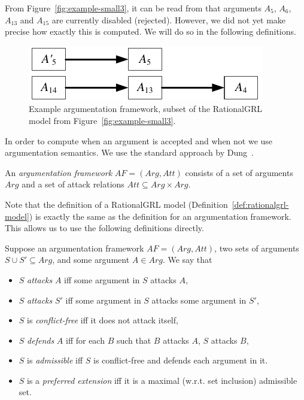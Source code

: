 
From Figure~\ref{fig:example-small3}, it can be read from that arguments $A_5$, $A_6$, $A_{13}$ and $A_{15}$ are currently disabled (rejected). However, we did not yet make precise how exactly this is computed. We will do so in the following definitions.
\begin{figure}[b]
\centering
\includegraphics[]{img/Example1-new-arguments.pdf}
\caption{Example argumentation framework, subset of the RationalGRL model from Figure~\ref{fig:example-small3}.}
\label{fig:goalmodeling:arg2}
\end{figure}
In order to compute when an argument is accepted and when not we use argumentation semantics.  We use the standard approach by Dung~\cite{Dung1995}. 

\begin{definition}
\label{def:argumentation-framework}
An \emph{argumentation framework} $AF=(Arg,Att)$ consists of a set of arguments $Arg$ and a set of attack relations $Att\subseteq Arg\times Arg.$
\end{definition}

Note that the definition of a RationalGRL model (Definition~\ref{def:rationalgrl-model}) is exactly the same as the definition for an argumentation framework. This allows us to use the following definitions directly.

\begin{definition} \label{def:semantics}Suppose an argumentation framework $AF=(Arg,Att)$, two sets of arguments $S\cup S'\subseteq Arg$, and some argument $A\in Arg$. We say that
\begin{itemize}
\item $S$ \emph{attacks} $A$ iff some argument in $S$ attacks $A$,
\item $S$ \emph{attacks} $S'$ iff some argument in $S$ attacks some argument in $S'$,
\item $S$ is \emph{conflict-free} iff it does not attack itself,
\item $S$ \emph{defends} $A$ iff for each $B$ such that $B$ attacks $A$, $S$ attacks $B$,
\item $S$ is \emph{admissible} iff $S$ is conflict-free and defends each argument in it.
\item $S$ is a \emph{preferred extension} iff it is a maximal (w.r.t. set inclusion) admissible set.
\end{itemize}
\end{definition}


